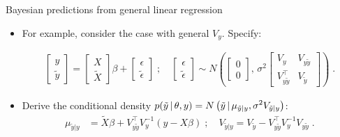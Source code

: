 \begin{frame}{Bayesian predictions from general linear regression}
 
 \begin{itemize}\setlength{\itemsep}{0.cm}  
  \item For example, consider the case with general $V_y$. Specify:

  \begin{align*}
 \begin{bmatrix} y \\ \tilde{y} \end{bmatrix} = \begin{bmatrix} X \\ \tilde{X} \end{bmatrix}\beta + \begin{bmatrix} \epsilon \\ \tilde{\epsilon} \end{bmatrix}\;;\quad \begin{bmatrix} \epsilon \\ \tilde{\epsilon} \end{bmatrix} \sim N\left(\begin{bmatrix} 0 \\ 0 \end{bmatrix},\, \sigma^2\begin{bmatrix} V_{y} & V_{y\tilde{y}} \\ V_{y\tilde{y}}^{\top} & V_{\tilde{y}} \end{bmatrix}\right)\; .  
\end{align*}
  
  \item Derive the conditional density $\displaystyle p(\tilde{y}\,|\, \theta, y) = N\left(\tilde{y}\,|\, \mu_{\tilde{y}|y}, \sigma^2 V_{\tilde{y}|y}\right)$:
\begin{align*}
 \mu_{\tilde{y}|y} &= \tilde{X}\beta + V_{y\tilde{y}}^{\top}V_y^{-1}(y-X\beta)\;;\quad V_{\tilde{y}|y} = V_{\tilde{y}} -  V_{y\tilde{y}}^{\top}V_y^{-1}V_{y\tilde{y}}\;.
\end{align*}


\end{itemize}
\end{frame}
